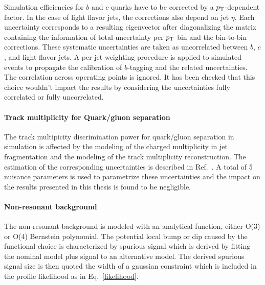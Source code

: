 Simulation efficiencies for $b$ and $c$ quarks have to be corrected by a
$p_{{\rm T}}$-dependent factor. In the case of light flavor jets, the corrections also 
depend on jet $\eta$. 
Each uncertainty corresponds to a resulting eigenvector after diagonalizing the matrix
containing the information of total uncertainty per $p_{{\rm T}}$ bin and the bin-to-bin 
corrections. These systematic
uncertainties are taken as uncorrelated between $b$, $c$, and light flavor jets.
A per-jet weighting procedure is applied to simulated events to propagate the 
calibration of $b$-tagging and the related uncertainties. 
The correlation across operating points is ignored. It has been checked that this choice
wouldn't impact the results by considering the uncertainties fully correlated or fully uncorrelated.


\paragraph{Track multiplicity for Quark/gluon separation}

The track multipicity discrimination power for quark/gluon separation in simulation 
is affected by the modeling of the charged multiplicity in jet fragmentation and the modeling of the
track multiplicity reconstruction. The estimation of the corresponding uncertainties is 
described in Ref.~\cite{qgtagging}. A total of 5 nuisance parameters is used to parametrize these
uncertainties and the impact on the results presented in this thesis is found to be negligible.

\paragraph{Non-resonant background}
The non-resonant background is modeled with an analytical function, either O(3) or O(4) Bernstein polynomial. 
The potential local bump or dip caused by the functional choice is characterized by spurious signal 
which is derived by fitting the nominal model plus signal to an alternative model. The derived spurious signal 
size is then quoted the width of a gaussian constraint which is included in the profile likelihood as in 
Eq.~\ref{likelihood}.

%
%

